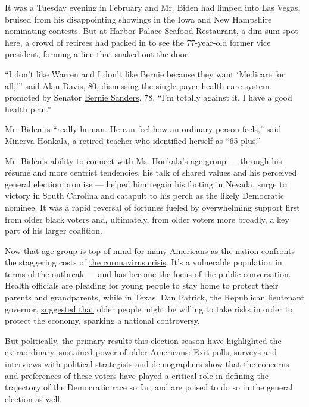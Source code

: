 It was a Tuesday evening in February and Mr. Biden had limped into Las
Vegas, bruised from his disappointing showings in the Iowa and New
Hampshire nominating contests. But at Harbor Palace Seafood Restaurant,
a dim sum spot here, a crowd of retirees had packed in to see the
77-year-old former vice president, forming a line that snaked out the
door.

``I don't like Warren and I don't like Bernie because they want
`Medicare for all,''' said Alan Davis, 80, dismissing the single-payer
health care system promoted by Senator
\href{https://www.nytimes.com/interactive/2020/us/elections/bernie-sanders.html}{Bernie
Sanders}, 78. ``I'm totally against it. I have a good health plan.''

Mr. Biden is ``really human. He can feel how an ordinary person feels,''
said Minerva Honkala, a retired teacher who identified herself as
``65-plus.''

Mr. Biden's ability to connect with Ms. Honkala's age group --- through
his résumé and more centrist tendencies, his talk of shared values and
his perceived general election promise --- helped him regain his footing
in Nevada, surge to victory in South Carolina and catapult to his perch
as the likely Democratic nominee. It was a rapid reversal of fortunes
fueled by overwhelming support first from older black voters and,
ultimately, from older voters more broadly, a key part of his larger
coalition.

Now that age group is top of mind for many Americans as the nation
confronts the staggering costs of
\href{https://www.nytimes.com/news-event/coronavirus}{the coronavirus
crisis}. It's a vulnerable population in terms of the outbreak --- and
has become the focus of the public conversation. Health officials are
pleading for young people to stay home to protect their parents and
grandparents, while in Texas, Dan Patrick, the Republican lieutenant
governor,
\href{https://www.nytimes.com/2020/03/24/us/coronavirus-texas-patrick-abbott.html}{suggested
that} older people might be willing to take risks in order to protect
the economy, sparking a national controversy.

But politically, the primary results this election season have
highlighted the extraordinary, sustained power of older Americans: Exit
polls, surveys and interviews with political strategists and
demographers show that the concerns and preferences of these voters have
played a critical role in defining the trajectory of the Democratic race
so far, and are poised to do so in the general election as well.

